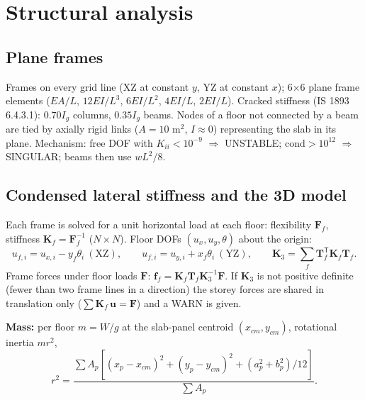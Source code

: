 \documentclass[10pt,a4paper]{article}
\begin{document}
\section{Structural analysis}
\subsection{Plane frames}
Frames on every grid line (XZ at constant $y$, YZ at constant $x$); 6$\times$6 plane frame elements
($EA/L$, $12EI/L^3$, $6EI/L^2$, $4EI/L$, $2EI/L$). Cracked stiffness (IS 1893 6.4.3.1): $0.70I_g$ columns,
$0.35I_g$ beams. Nodes of a floor not connected by a beam are tied by axially rigid links ($A=10$ m$^2$,
$I\approx0$) representing the slab in its plane. Mechanism: free DOF with $K_{ii}<10^{-9}$ $\Rightarrow$ UNSTABLE;
$\mathrm{cond}>10^{12}$ $\Rightarrow$ SINGULAR; beams then use $wL^2/8$.

\subsection{Condensed lateral stiffness and the 3D model}
Each frame is solved for a unit horizontal load at each floor: flexibility $\mathbf F_f$, stiffness
$\mathbf K_f=\mathbf F_f^{-1}$ ($N\times N$). Floor DOFs $(u_x,u_y,\theta)$ about the origin:
\[
u_{f,i}=u_{x,i}-y_f\theta_i\ (\text{XZ}),\qquad u_{f,i}=u_{y,i}+x_f\theta_i\ (\text{YZ}),\qquad
\mathbf K_3=\sum_f \mathbf T_f^{\mathsf T}\mathbf K_f\mathbf T_f .
\]
Frame forces under floor loads $\mathbf F$: $\mathbf f_f=\mathbf K_f\mathbf T_f\mathbf K_3^{-1}\mathbf F$. If
$\mathbf K_3$ is not positive definite (fewer than two frame lines in a direction) the storey forces are shared in
translation only ($\sum\mathbf K_f\,\mathbf u=\mathbf F$) and a WARN is given.

\textbf{Mass:} per floor $m=W/g$ at the slab-panel centroid $(x_{cm},y_{cm})$, rotational inertia $m r^2$,
\[
r^2=\frac{\sum A_p\left[(x_p-x_{cm})^2+(y_p-y_{cm})^2+(a_p^2+b_p^2)/12\right]}{\sum A_p}.
\]
\end{document}
